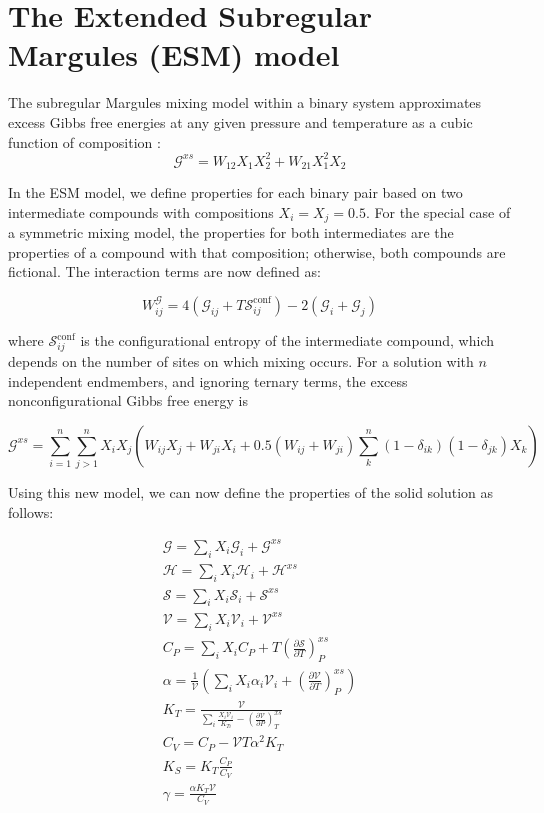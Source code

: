 \documentclass[review]{elsarticle}
\begin{document}
\section{The Extended Subregular Margules (ESM) model}
The subregular Margules mixing model within a binary system approximates excess Gibbs free energies at any given pressure and temperature as a cubic function of composition \citep{HW1989}:
\begin{equation}
  \mathcal{G}^{xs} = W_{12} X_1X_2^2 + W_{21} X_1^2X_2 
\end{equation}

In the ESM model, we define properties for each binary pair based on two intermediate compounds with compositions $X_i = X_j = 0.5$. For the special case of a symmetric mixing model, the properties for both intermediates are the properties of a compound with that composition; otherwise, both compounds are fictional. The interaction terms are now defined as:

\begin{equation}
  W^{\mathcal{G}}_{ij} = 4(\mathcal{G}_{ij} + T\mathcal{S}^{\textrm{conf}}_{ij}) - 2(\mathcal{G}_i + \mathcal{G}_j)
\end{equation}

\noindent where $\mathcal{S}^{\textrm{conf}}_{ij}$ is the configurational entropy of the intermediate compound, which depends on the number of sites on which mixing occurs. For a solution with $n$ independent endmembers, and ignoring ternary terms, the excess nonconfigurational Gibbs free energy is \citep{HW1989} 

\begin{equation}
  \mathcal{G}^{xs} = \sum_{i=1}^n \sum_{j>1}^n X_i X_j \left ( W_{ij} X_j + W_{ji} X_i + 0.5 (W_{ij} + W_{ji}) \sum_k^n (1-\delta_{ik})(1-\delta_{jk}) X_k \right)
  \label{xs}
\end{equation}

Using this new model, we can now define the properties of the solid solution as follows:

\begin{eqnarray}
\mathcal{G} = \sum_i X_i \mathcal{G}_i + \mathcal{G}^{xs} \\
\mathcal{H} = \sum_i X_i \mathcal{H}_i + \mathcal{H}^{xs} \\
\mathcal{S} = \sum_i X_i \mathcal{S}_i + \mathcal{S}^{xs} \\
\mathcal{V} = \sum_i X_i \mathcal{V}_i + \mathcal{V}^{xs} \\
C_P = \sum_i X_i C_P  + T \left( \frac{\partial \mathcal{S}}{\partial T} \right)_P^{xs} \\
\alpha = \frac{1}{\mathcal{V}} \left ( \sum_i X_i \alpha_i \mathcal{V}_i + \left( \frac{\partial \mathcal{V}}{\partial T} \right)_P^{xs} \right) \label{alpha} \\
K_T = \frac{\mathcal{V}}{\sum_i \frac{X_i \mathcal{V}_i }{K_{Ti}} - \left( \frac{\partial \mathcal{V}}{\partial P} \right)_T^{xs} } \label{K_T} \\
C_V = C_P - \mathcal{V} T \alpha^2 K_T \\
K_S = K_T \frac{C_P}{C_V} \\
\gamma = \frac{\alpha K_T \mathcal{V}}{C_V}   
\end{eqnarray}
\end{document}
